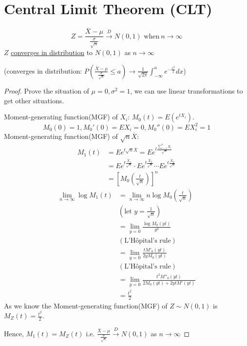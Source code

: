 \documentclass[11pt]{elegantbook}
\begin{document}
\section{Central Limit Theorem (CLT)}
\begin{theorem}\label{CLT}
    $$Z=\frac{\overline{X}-\mu}{\frac{\sigma}{\sqrt{n}}} \xrightarrow {D} N(0,1) \text{ when}\ n\to \infty$$
    $Z$ \underline{converges in distribution} to $N(0,1)$ as $n\to \infty$

    (converges in distribution: $P(\frac{\overline{X}-\mu}{\frac{\sigma}{\sqrt{n}}}\leq a)\rightarrow \frac{1}{\sqrt{2\pi}}\int_{-\infty}^ae^{-\frac{x^2}{2}}dx$)
\end{theorem}
\begin{proof}
    Prove the situation of $\mu=0,\sigma^2=1$, we can use linear transformations to get other situations.

    Moment-generating function(MGF) of $X_i$: $M_0(t)=E(e^{tX_i})$. $$M_0(0)=1,M_0'(0)=EX_i=0,M_0''(0)=EX_i^2=1$$
    Moment-generating function(MGF) of $\sqrt{n}\overline{X}$:
    \begin{equation}
        \begin{aligned}
            M_1(t)&=Ee^{t\sqrt{n}\overline{X}}=Ee^{t\frac{\sum_{i=1}^nX_i}{\sqrt{n}}}\\
            &=Ee^{t\frac{X_1}{\sqrt{n}}}\cdot Ee^{t\frac{X_2}{\sqrt{n}}}\cdots Ee^{t\frac{X_n}{\sqrt{n}}}\\
            &=[M_0(\frac{t}{\sqrt{n}})]^n
        \end{aligned}
        \nonumber
    \end{equation}
    \begin{equation}
        \begin{aligned}
            \lim_{n \rightarrow	\infty}\log M_1(t)&=\lim_{n \rightarrow	\infty}n\log M_0(\frac{t}{\sqrt{n}})\\
            &(\text{let }y=\frac{1}{\sqrt{n}})\\
            &=\lim_{y=0}\frac{\log M_0(yt)}{y^2}\\
            &(\text{L'Hôpital's rule})\\
            &=\lim_{y=0}\frac{t M'_0(yt)}{2y M_0(yt)}\\
            &(\text{L'Hôpital's rule})\\
            &=\lim_{y=0}\frac{t^2 M''_0(yt)}{2 M_0(yt)+2ytM'(yt)}\\
            &=\frac{t^2}{2}
        \end{aligned}
        \nonumber
    \end{equation}
    As we know the Moment-generating function(MGF) of $Z\sim N(0,1)$ is $M_Z(t)=\frac{t^2}{2}$.

    Hence, $M_1(t)=M_Z(t)$ i.e. $\frac{\overline{X}-\mu}{\frac{\sigma}{\sqrt{n}}} \xrightarrow {D} N(0,1)$ as $n \rightarrow\infty$
\end{proof}
\end{document}
